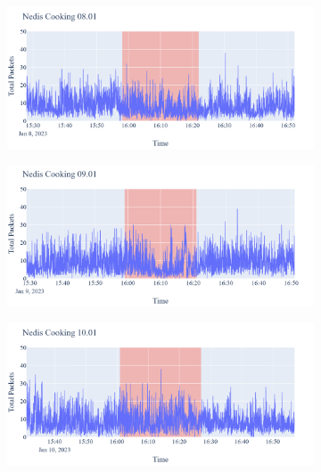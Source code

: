 \begin{figure}[H]
    \begin{subfigure}[b]{0.5\textwidth}
        \centering
        \includegraphics[width=1.2\hsize]{figures/Nedis_Cooking_Packets_08.01.png}
    \end{subfigure}
    \begin{subfigure}[b]{0.5\textwidth}
        \centering
        \includegraphics[width=1.2\hsize]{figures/Nedis_Cooking_Packets_09.01.png}
    \end{subfigure}
    \begin{subfigure}[b]{0.5\textwidth}
        \centering
        \includegraphics[width=1.2\hsize]{figures/Nedis_Cooking_Packets_10.01.png}
    \end{subfigure}
    \begin{subfigure}[b]{0.5\textwidth}

\end{subfigure}
\end{figure}
